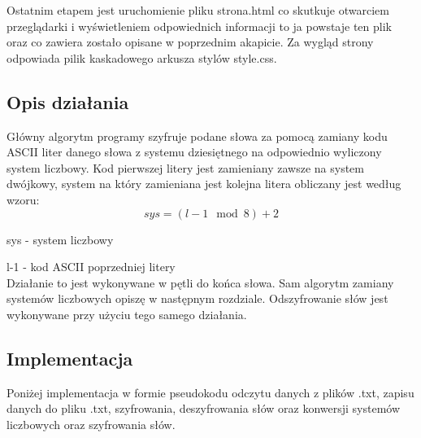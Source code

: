 \documentclass[12pt,a4paper]{article}
\begin{document}
Ostatnim etapem jest uruchomienie pliku strona.html co skutkuje otwarciem przeglądarki i wyświetleniem odpowiednich informacji to ja powstaje ten plik oraz co zawiera zostało opisane w poprzednim akapicie. Za wygląd strony odpowiada pilik kaskadowego arkusza stylów style.css.  

	
	\subsection*{Opis działania} 
Główny algorytm programy szyfruje podane słowa za pomocą zamiany kodu ASCII liter danego słowa z systemu dziesiętnego na odpowiednio wyliczony system liczbowy. Kod pierwszej litery jest zamieniany zawsze na system dwójkowy, system na który zamieniana jest kolejna litera obliczany jest według wzoru: $$sys=(l-1\mod{8})+2$$ 


sys - system liczbowy


l-1 - kod ASCII poprzedniej litery \\

Działanie to jest wykonywane w pętli do końca słowa. Sam algorytm zamiany systemów liczbowych opiszę w następnym rozdziale. Odszyfrowanie słów jest wykonywane przy użyciu tego samego działania.
	\subsection*{Implementacja}
Poniżej implementacja w formie pseudokodu odczytu danych z plików .txt, zapisu danych do pliku .txt, szyfrowania, deszyfrowania słów oraz konwersji systemów liczbowych oraz szyfrowania słów.
\end{document}
